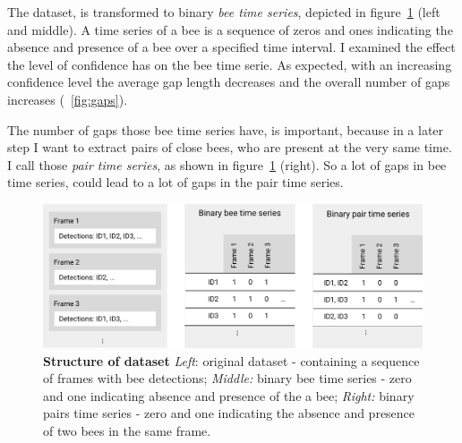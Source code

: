 The dataset, is transformed to binary \emph{bee time series}, depicted in figure~\ref{fig:structure} (left and middle). A time series of a bee is a sequence of zeros and ones indicating the absence and presence of a bee over a specified time interval. 
I examined the effect the level of confidence has on the bee time serie.
As expected, with an increasing confidence level the average gap length decreases and the overall number of gaps increases (~\ref{fig:gaps}).

The number of gaps those bee time series have, is important, because in a later step I want to extract pairs of close bees, who are present at the very same time. I call those \emph{pair time series}, as shown in figure~\ref{fig:structure} (right). So a lot of gaps in bee time series, could lead to a lot of gaps in the pair time series.

\begin{figure}[htb]
	\centering
	\includegraphics[width=1.0\textwidth]{Figures/structure}
	\caption[Structure of dataset]{\textbf{Structure of dataset} \emph{Left}: original dataset - containing a sequence of frames with bee detections; \emph{Middle:} binary bee time series - zero and one indicating absence and presence of the a bee; \emph{Right:} binary pairs time series - zero and one indicating the absence and presence of two bees in the same frame.}
	\label{fig:structure}
\end{figure}

